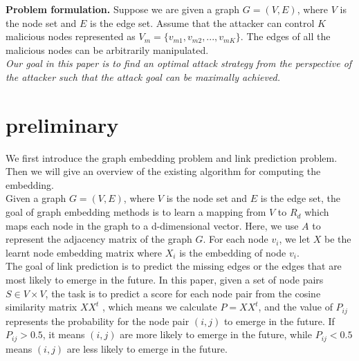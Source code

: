 \documentclass{acmtog} %
\begin{document}
{\bfseries Problem formulation.} Suppose we are given a graph $G=(V,E)$, where $V$ is the node set and $E$ is the edge set. Assume that the attacker can control $K$ malicious nodes represented as $V_m = \{v_{m1},v_{m2}, ...,v_{mK}\}$. The edges of all the malicious nodes can be arbitrarily manipulated.\\
\indent \emph{Our goal in this paper is to find an optimal attack strategy from the perspective of the attacker such that the attack goal can be maximally achieved.}
\section{preliminary}
We first introduce the graph embedding problem and link prediction problem. Then we will give an overview of the existing algorithm for computing the embedding. \\
 Given a graph $G=(V, E)$, where $V$ is the node set and $E$ is the edge set, the goal of graph embedding methods is to learn a mapping from $V$ to $R_d$ which maps each node in the graph to a d-dimensional vector. Here, we use $A$ to represent the adjacency matrix of the graph $G$. For each node $v_i$, we let $X$ be the learnt node embedding matrix where $X_i$ is the embedding of node $v_i$.\\
 The goal of link prediction is to predict the missing edges or the edges that are most likely to emerge in the future. In this paper, given a set of node pairs $S\in V \times V$, the task is to predict a score for each node pair from the cosine similarity matrix $XX^t$ , which means we calculate $P=XX^t$, and the value of $P_{ij}$ represents the probability for the node pair $(i,j)$ to emerge in the future. If $P_{ij}>0.5$, it means $(i,j)$ are more likely to emerge in the future, while $P_{ij}<0.5$ means $(i,j)$ are less likely to emerge in the future.
\end{document}
